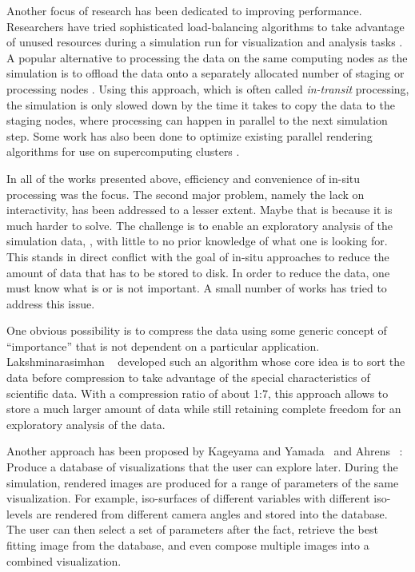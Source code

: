 %
Another focus of research has been dedicated to improving performance.
%
Researchers have tried sophisticated load-balancing algorithms to take advantage
of unused resources during a simulation run for visualization and analysis tasks
\cite{Zheng2013}.
%
A popular alternative to processing the data on the same computing nodes as the
simulation is to offload the data onto a separately allocated number of staging
or processing
nodes \cite{Zheng2010,Abbasi2010,Abbasi2011,Docan2011,Docan2012,Bennett2012}.
%
Using this approach, which is often called \emph{in-transit} processing, the
simulation is only slowed down by the time it takes to copy the data to the
staging nodes, where processing can happen in parallel to the next simulation
step.
%
Some work has also been done to optimize existing parallel rendering algorithms
for use on supercomputing
clusters \cite{Yu2008,Kendall2010,Moreland2011a,Cavin2012,Nonaka2014,Grosset2016}.
%

%
In all of the works presented above, efficiency and convenience of in-situ
processing was the focus.
%
The second major problem, namely the lack on interactivity, has been addressed
to a lesser extent.
%
Maybe that is because it is much harder to solve.
%
The challenge is to enable an exploratory analysis of the simulation data, \ie,
with little to no prior knowledge of what one is looking for.
%
This stands in direct conflict with the goal of in-situ approaches to reduce the
amount of data that has to be stored to disk.
%
In order to reduce the data, one must know what is or is not important.
%
A small number of works has tried to address this issue.
%

%
One obvious possibility is to compress the data using some generic concept of
``importance'' that is not dependent on a particular application.
%
Lakshminarasimhan \etal~\cite{Lakshminarasimhan2011} developed such an algorithm
whose core idea is to sort the data before compression to take advantage of the
special characteristics of scientific data.
%
With a compression ratio of about 1:7, this approach allows to store a much larger
amount of data while still retaining complete freedom for an exploratory
analysis of the data.
%

%
Another approach has been proposed by Kageyama and Yamada~\cite{Kageyama2014}
and Ahrens \etal~\cite{Ahrens2014}:
%
Produce a database of visualizations that the user can explore later.
%
During the simulation, rendered images are produced for a range of parameters
of the same visualization.
%
For example, iso-surfaces of different variables with different iso-levels are
rendered from different camera angles and stored into the database.
%
The user can then select a set of parameters after the fact, retrieve the
best fitting image from the database, and even compose multiple images into
a combined visualization.
%

